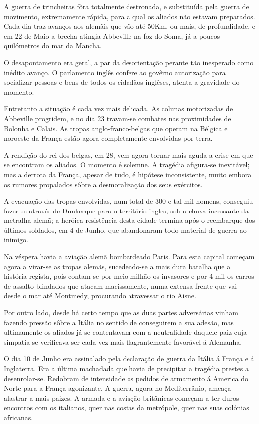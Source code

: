 \documentclass[9pt]{article}
\begin{document}
A guerra de trincheiras fôra totalmente
 destronada, e substituída pela guerra de movimento, extremamente rápida,
 para a qual os aliados não
estavam preparados. Cada dia traz avanços aos alemãis que vão até 50Km.
ou mais, de profundidade, e em 22 de Maio a brecha atingia Abbeville na
foz do Soma, já a poucos quilómetros do mar da Mancha.

O desapontamento era geral, a par da desorienta\-ção perante tão inesperado como inédito avanço. O parlamento inglês confere ao govêr\-no autoriza\-ção para socializar pessoas e bens de todos os cidadãos in\-glêses,
atenta a gravidade do momento.

Entretanto a situa\-ção é cada vez mais delicada. As colunas motorizadas de Abbeville progridem, e no dia 23 travam-se combates nas proximidades de Bolonha e Calais. As tropas anglo-franco-belgas que operam
na Bélgica e noroeste da Fran\-ça estão agora completamente envolvidas
por terra.

A rendi\-ção do rei dos belgas, em 28, vem agora tornar mais aguda a
crise em que se encontram os aliados. O momento é solemne. A tragédia
afigura-se inevitável; mas a derrota da Fran\-ça, apesar de tudo, é hipótese
inconsistente, muito embora os rumores propalados sôbre a desmoraliza\-ção
dos seus exércitos.

A evacua\-ção das tropas envolvidas, num total de 300 e tal mil homens,
conseguiu fazer-se através de Dunkerque para o território ingles, sob a
chuva incessante da metra\-lha alemã; a heróica resistência desta cidade
termina após o reembarque dos últimos soldados, em 4 de Junho, que abandonaram todo material de guerra ao inimigo.

Na véspera havia a avia\-ção alemã bombardeado Paris. Para esta capital começam agora a virar-se as tropas alemãs, sucedendo-se a mais dura
bata\-lha que a his\-tó\-ria regista, pois contam-se por meio mi\-lhão os invasores e por 4 mil os carros de assalto blindados que atacam macissamente,
numa extensa frente que vai desde o mar até Montmedy, procurando atravessar o rio Aisne.

Por outro lado, desde há certo tempo que as duas partes adversárias
vinham fazendo pressão sôbre a Itália no sentido de conseguirem a sua
adesão, mas ultimamente os aliados já se contentavam com a neutralidade
daquele paiz cuja simpatia se verifi\-cava ser cada vez mais flagrantemente favorável á Alemanha.

O dia 10 de Junho era assinalado pela declara\-ção de guerra da Itália
á Fran\-ça e á Inglaterra. Era a última machadada que havia de precipitar
a tragédia prestes a desenrolar-se. Redobram de intensidade os pedidos
de armamento á America do Norte para a Fran\-ça agonizante. A guerra, agora no Mediterrânio, ameaça alastrar a mais paizes. A armada e a avia\-ção
britânicas começam a ter duros encontros com os italianos, quer nas costas da metrópole, quer nas suas colónias africanas.
\end{document}

